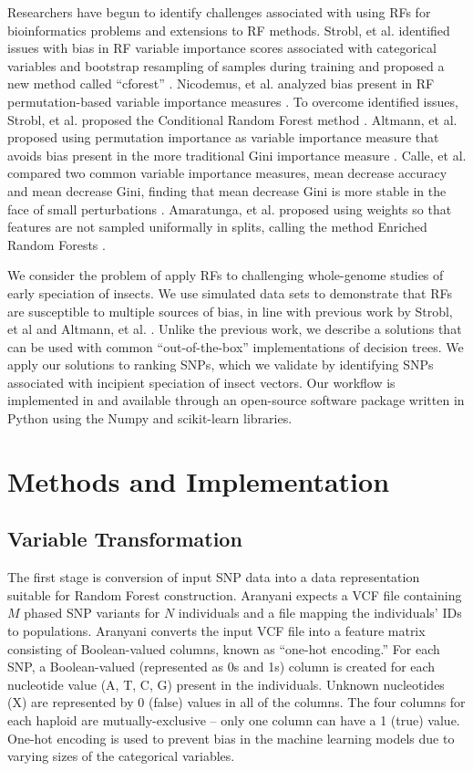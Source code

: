 Researchers have begun to identify challenges associated with using RFs for bioinformatics problems and extensions to RF methods. Strobl, et al. identified issues with bias in RF variable importance scores associated with categorical variables and bootstrap resampling of samples during training and proposed a new method called ``cforest'' \cite{Strobl2007}. Nicodemus, et al. analyzed bias present in RF permutation-based variable importance measures \cite{Nicodemus2010}. To overcome identified issues, Strobl, et al. proposed the Conditional Random Forest method \cite{Strobl2008}. Altmann, et al. proposed using permutation importance as variable importance measure that avoids bias present in the more traditional Gini importance measure \cite{Altmann2010}. Calle, et al. compared two common variable importance measures, mean decrease accuracy and mean decrease Gini, finding that mean decrease Gini is more stable in the face of small perturbations \cite{Calle2011}. Amaratunga, et al. proposed using weights so that features are not sampled uniformally in splits, calling the method Enriched Random Forests \cite{Amaratunga2008}.

We consider the problem of apply RFs to challenging whole-genome studies of early speciation of insects. We use simulated data sets to demonstrate that RFs are susceptible to multiple sources of bias, in line with previous work by Strobl, et al \cite{Strobl2007, Strobl2008, Nicodemus2010} and Altmann, et al. \cite{Altmann2010}. Unlike the previous work, we describe a solutions that can be used with common ``out-of-the-box'' implementations of decision trees. We apply our solutions to ranking SNPs, which we validate by identifying SNPs associated with incipient speciation of insect vectors.  Our workflow is implemented in and available through an open-source software package written in Python using the Numpy and scikit-learn libraries.


\section{Methods and Implementation}


\subsection{Variable Transformation}
The first stage is conversion of input SNP data into a data representation suitable for Random Forest construction.  Aranyani expects a VCF file containing $M$ phased SNP variants for $N$ individuals and a file mapping the individuals' IDs to populations.  Aranyani converts the input VCF file into a feature matrix consisting of Boolean-valued columns, known as ``one-hot encoding.'' For each SNP, a Boolean-valued (represented as 0s and 1s) column is created for each nucleotide value (A, T, C, G) present in the individuals.  Unknown nucleotides (X) are represented by 0 (false) values in all of the columns.  The four columns for each haploid are mutually-exclusive -- only one column can have a 1 (true) value.  One-hot encoding is used to prevent bias in the machine learning models due to varying sizes of the categorical variables.


